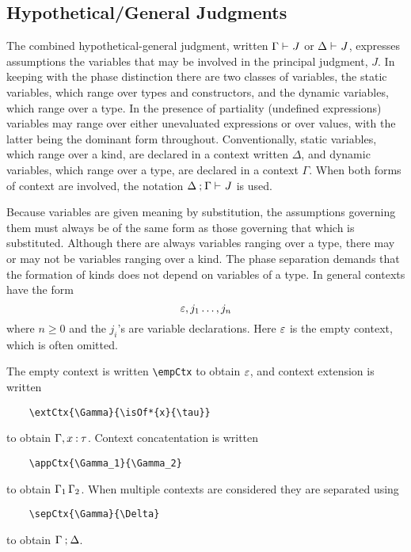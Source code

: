 \documentclass[11pt]{article}
\begin{document}
\subsection*{Hypothetical/General Judgments}

The combined hypothetical-general judgment, written $\Gamma\entails J$ or $\Delta\entails J$, expresses assumptions the variables that may be involved in the principal judgment, $J$.  In keeping with the phase distinction there are two classes of variables, the static variables, which range over types and constructors, and the dynamic variables, which range over a type.  In the presence of partiality (undefined expressions) variables may range over either unevaluated expressions or over values, with the latter being the dominant form throughout.  Conventionally, static variables, which range over a kind, are declared in a context written $\Delta$, and dynamic variables, which range over a type, are declared in a context $\Gamma$.  When both forms of context are involved, the notation $\sepCtx{\Delta}{\Gamma}\entails J$ is used.

Because variables are given meaning by substitution, the assumptions governing them must always be of the same form as those governing that which is substituted.  Although there are always variables ranging over a type, there may or may not be variables ranging over a kind.  The phase separation demands that the formation of kinds does not depend on variables of a type.  In general contexts have the form
\[
    \varepsilon,j_1\dots,j_n
\]
where $n\geq 0$ and the $j_i$'s are variable declarations.  Here $\varepsilon$ is the empty context, which is often omitted.

The empty context is written \verb|\empCtx| to obtain $\varepsilon$, and context extension is written 
\begin{verbatim}
    \extCtx{\Gamma}{\isOf*{x}{\tau}}
\end{verbatim}
to obtain $\extCtx{\Gamma}{\isOf*{x}{\tau}}$.  Context concatentation is written 
\begin{verbatim}
    \appCtx{\Gamma_1}{\Gamma_2}
\end{verbatim}
to obtain $\Gamma_1\,\Gamma_2$.  When multiple contexts are considered they are separated using 
\begin{verbatim}
    \sepCtx{\Gamma}{\Delta}
\end{verbatim}
to obtain $\Gamma\mathbin{;}\Delta$.
\end{document}
